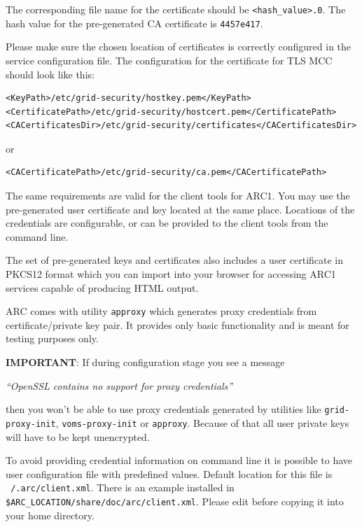 \documentclass{article}                            %
\begin{document}
The corresponding file name for the certificate should be
\texttt{<hash\_value>.0}. The hash value for the pre-generated CA certificate is
\texttt{4457e417}.

Please make sure the chosen location of certificates is correctly configured in
the service configuration file. The configuration for the certificate for TLS
MCC should look like this:

\begin{lstlisting}
<KeyPath>/etc/grid-security/hostkey.pem</KeyPath>
<CertificatePath>/etc/grid-security/hostcert.pem</CertificatePath>
<CACertificatesDir>/etc/grid-security/certificates</CACertificatesDir>
\end{lstlisting}

or

\begin{lstlisting}
<CACertificatePath>/etc/grid-security/ca.pem</CACertificatePath>
\end{lstlisting}

The same requirements are valid for the client tools for ARC1. You may use the
pre-generated user certificate and key located at the same place. Locations of
the credentials are configurable, or can be provided to the client tools from
the command line.

The set of pre-generated keys and certificates also includes a user certificate
in PKCS12 format which you can import into your browser for accessing ARC1
services capable of producing HTML output.

ARC comes with utility \texttt{approxy} which generates proxy credentials from
certificate/private key pair. It provides only basic functionality and is meant
for testing purposes only.

\begin{framed}
\textbf{IMPORTANT}: If during configuration stage you see a message

 \textit{``OpenSSL contains no support for proxy credentials''}

then you won't be able to use proxy credentials generated by utilities
like \texttt{grid-proxy-init}, \texttt{voms-proxy-init} or \texttt{approxy}.
Because of that all user private keys will have to be kept unencrypted.
\end{framed}

To avoid providing credential information on command line it is possible to have
user configuration file with predefined values. Default location for this file
is \texttt{~/.arc/client.xml}. There is an example installed in
\verb|$ARC_LOCATION/share/doc/arc/client.xml|. Please edit before copying it
into your home directory.
\end{document}
